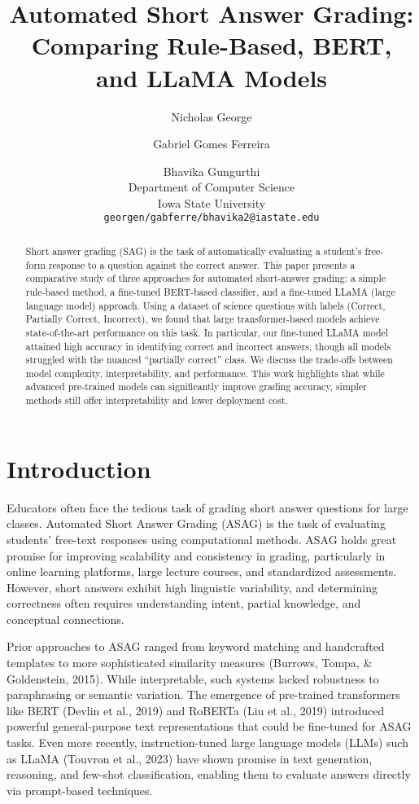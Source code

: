 \documentclass[11pt]{article}
\title{Automated Short Answer Grading: Comparing Rule-Based, BERT, and LLaMA Models}
\author{Nicholas George \and Gabriel Gomes Ferreira \and Bhavika Gungurthi\\
  Department of Computer Science \\ Iowa State University \\ 
  \texttt{georgen/gabferre/bhavika2@iastate.edu}}
\date{}
\begin{document}
\maketitle

\begin{abstract}
Short answer grading (SAG) is the task of automatically evaluating a student's free-form response to a question against the correct answer. This paper presents a comparative study of three approaches for automated short-answer grading: a simple rule-based method, a fine-tuned BERT-based classifier, and a fine-tuned LLaMA (large language model) approach. Using a dataset of science questions with labels (Correct, Partially Correct, Incorrect), we found that large transformer-based models achieve state-of-the-art performance on this task. In particular, our fine-tuned LLaMA model attained high accuracy in identifying correct and incorrect answers, though all models struggled with the nuanced “partially correct” class. We discuss the trade-offs between model complexity, interpretability, and performance. This work highlights that while advanced pre-trained models can significantly improve grading accuracy, simpler methods still offer interpretability and lower deployment cost.
\end{abstract}

\section{Introduction}
Educators often face the tedious task of grading short answer questions for large classes. Automated Short Answer Grading (ASAG) is the task of evaluating students’ free-text responses using computational methods. ASAG holds great promise for improving scalability and consistency in grading, particularly in online learning platforms, large lecture courses, and standardized assessments. However, short answers exhibit high linguistic variability, and determining correctness often requires understanding intent, partial knowledge, and conceptual connections.

Prior approaches to ASAG ranged from keyword matching and handcrafted templates to more sophisticated similarity measures (Burrows, Tompa, \& Goldenstein, 2015). While interpretable, such systems lacked robustness to paraphrasing or semantic variation. The emergence of pre-trained transformers like BERT (Devlin et al., 2019) and RoBERTa (Liu et al., 2019) introduced powerful general-purpose text representations that could be fine-tuned for ASAG tasks. Even more recently, instruction-tuned large language models (LLMs) such as LLaMA (Touvron et al., 2023) have shown promise in text generation, reasoning, and few-shot classification, enabling them to evaluate answers directly via prompt-based techniques. 
\end{document}
